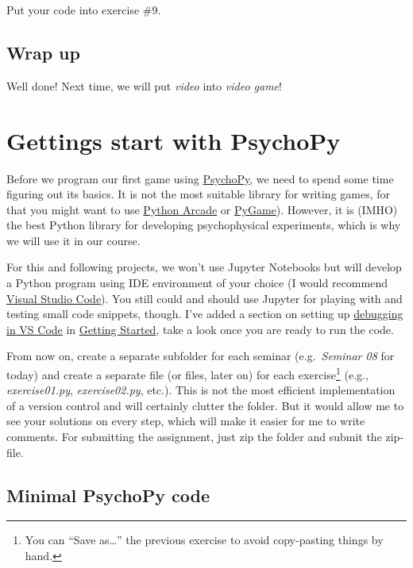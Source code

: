 \documentclass[
]{book}
\begin{document}
Put your code into exercise \#9.

\hypertarget{wrap-up-2}{%
\section{Wrap up}\label{wrap-up-2}}

Well done! Next time, we will put \emph{video} into \emph{video game}!

\hypertarget{seminar08}{%
\chapter{Gettings start with PsychoPy}\label{seminar08}}

Before we program our first game using \href{https://psychopy.org/}{PsychoPy}, we need to spend some time figuring out its basics. It is not the most suitable library for writing games, for that you might want to use \href{https://arcade.academy/}{Python Arcade} or \href{https://www.pygame.org/}{PyGame}). However, it is (IMHO) the best Python library for developing psychophysical experiments, which is why we will use it in our course.

For this and following projects, we won't use Jupyter Notebooks but will develop a Python program using IDE environment of your choice (I would recommend \protect\hyperlink{install-vs-code}{Visual Studio Code}). You still could and should use Jupyter for playing with and testing small code snippets, though. I've added a section on setting up \protect\hyperlink{debug-in-vs-code}{debugging in VS Code} in \protect\hyperlink{getting-started}{Getting Started}, take a look once you are ready to run the code.

From now on, create a separate subfolder for each seminar (e.g.~\emph{Seminar 08} for today) and create a separate file (or files, later on) for each exercise\footnote{You can ``Save as\ldots{}'' the previous exercise to avoid copy-pasting things by hand.} (e.g., \emph{exercise01.py}, \emph{exercise02.py}, etc.). This is not the most efficient implementation of a version control and will certainly clutter the folder. But it would allow me to see your solutions on every step, which will make it easier for me to write comments. For submitting the assignment, just zip the folder and submit the zip-file.

\hypertarget{minimal-psychopy-code}{%
\section{Minimal PsychoPy code}\label{minimal-psychopy-code}}
\end{document}
